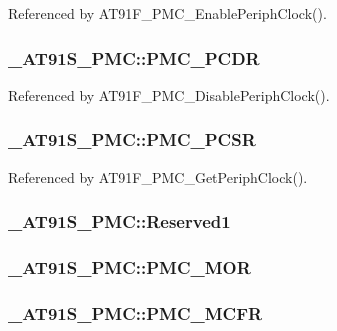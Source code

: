 Referenced by AT91F\_\-PMC\_\-EnablePeriphClock().\hypertarget{struct__AT91S__PMC_2c995bed4a6b1c2fbae4abbc51e63dae}{
\subsubsection{ {\bf \_\-AT91S\_\-PMC::PMC\_\-PCDR}}}
\label{struct__AT91S__PMC_2c995bed4a6b1c2fbae4abbc51e63dae}




Referenced by AT91F\_\-PMC\_\-DisablePeriphClock().\hypertarget{struct__AT91S__PMC_3ba02e62e84225fae0f948a38753c027}{
\subsubsection{ {\bf \_\-AT91S\_\-PMC::PMC\_\-PCSR}}}
\label{struct__AT91S__PMC_3ba02e62e84225fae0f948a38753c027}




Referenced by AT91F\_\-PMC\_\-GetPeriphClock().\hypertarget{struct__AT91S__PMC_c82dc0a86cbd07091bbd7a385dde5c16}{
\subsubsection{ {\bf \_\-AT91S\_\-PMC::Reserved1}}}
\label{struct__AT91S__PMC_c82dc0a86cbd07091bbd7a385dde5c16}


\hypertarget{struct__AT91S__PMC_60d9f7a2b18f12ca66bfc5591d871720}{
\subsubsection{ {\bf \_\-AT91S\_\-PMC::PMC\_\-MOR}}}
\label{struct__AT91S__PMC_60d9f7a2b18f12ca66bfc5591d871720}


\hypertarget{struct__AT91S__PMC_581053b5c3a5d9b4527f82ee1437dfc8}{
\subsubsection{ {\bf \_\-AT91S\_\-PMC::PMC\_\-MCFR}}}
\label{struct__AT91S__PMC_581053b5c3a5d9b4527f82ee1437dfc8}


